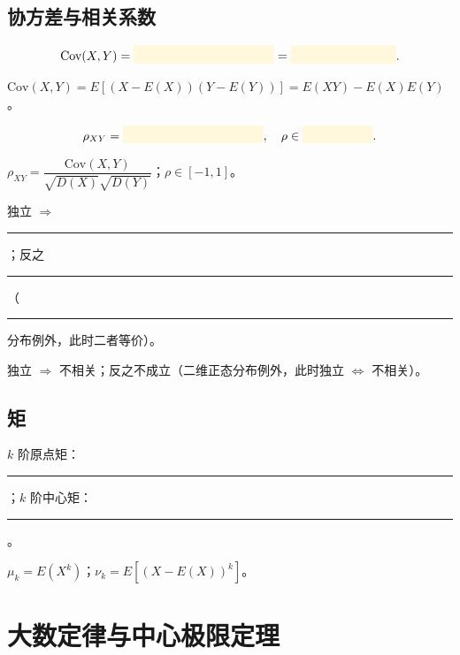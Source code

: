 \documentclass[11pt,a4paper]{article}
\newcommand{\blankbox}[1]{%
  \textcolor{blankyellow}{\rule[-0.1cm]{#1}{0.5cm}}%
}
\begin{document}
\subsection{协方差与相关系数}

\begin{formulabox}[协方差]
\[\mathrm{Cov}(X,Y) = \blankbox{4cm} = \blankbox{3cm}.\]
\end{formulabox}

\begin{answerbox}
$\mathrm{Cov}(X,Y)=E[(X-E(X))(Y-E(Y))]=E(XY)-E(X)E(Y)$。
\end{answerbox}

\begin{formulabox}[相关系数]
\[\rho_{XY} = \blankbox{4cm}, \quad \rho\in\blankbox{2cm}.\]
\end{formulabox}

\begin{answerbox}
$\rho_{XY}=\dfrac{\mathrm{Cov}(X,Y)}{\sqrt{D(X)}\sqrt{D(Y)}}$；$\rho\in[-1,1]$。
\end{answerbox}

\begin{formulabox}[独立与不相关]
独立 $\Rightarrow$ \blankbox{2cm}；反之\blankbox{2cm}（\blankbox{3cm} 分布例外，此时二者等价）。
\end{formulabox}

\begin{answerbox}
独立 $\Rightarrow$ 不相关；反之不成立（二维正态分布例外，此时独立 $\iff$ 不相关）。
\end{answerbox}

\subsection{矩}

\begin{formulabox}[原点矩与中心矩]
$k$ 阶原点矩：\blankbox{3cm}；$k$ 阶中心矩：\blankbox{3cm}。
\end{formulabox}

\begin{answerbox}
$\mu_k=E(X^k)$；$\nu_k=E[(X-E(X))^k]$。
\end{answerbox}

\section{大数定律与中心极限定理}
\end{document}
